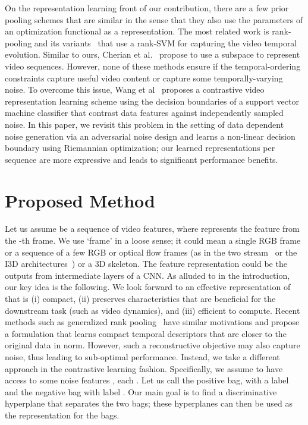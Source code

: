 \documentclass[runningheads]{llncs}
\begin{document}
On the representation learning front of our contribution, there are a few prior pooling schemes that are similar in the sense that they also use the parameters of an optimization functional as a representation. The most related work is rank-pooling and its variants~\cite{fernando2016learning,fernando2015modeling,fernando2016discriminative,su2016hierarchical,bilen2017action,cherian2018non,wang2017ordered} that use a rank-SVM for capturing the video temporal evolution. Similar to ours, Cherian et al.~\cite{grp} propose to use a subspace  to represent video sequences. However, none of these methods ensure if the temporal-ordering constraints capture useful video content or capture some temporally-varying noise. To overcome this issue, Wang et al~\cite{wang2018video} proposes a contrastive video representation learning scheme using the decision boundaries of a support vector machine classifier that contrast data features against independently sampled noise. In this paper, we revisit this problem in the setting of data dependent noise generation via an adversarial noise design and learns a non-linear decision boundary using Riemannian optimization; our learned representations per sequence are more expressive and leads to significant performance benefits.  \section{Proposed Method}
Let us assume  be a sequence of video features, where  represents the feature from the -th frame. We use `frame' in a loose sense; it could mean a single RGB frame or a sequence of a few RGB or optical flow frames (as in the two stream~\cite{simonyan2014very} or the I3D architectures~\cite{carreira2017quo}) or a 3D skeleton. The feature representation  could be the outputs from intermediate layers of a CNN. As alluded to in the introduction, our key idea is the following. We look forward to an effective representation of  that is (i) compact, (ii) preserves characteristics that are beneficial for the downstream task (such as video dynamics), and (iii) efficient to compute. Recent methods such as generalized rank pooling~\cite{grp} have similar motivations and propose a formulation that learns compact temporal descriptors that are closer to the original data in  norm. However, such a reconstructive objective may also capture noise, thus leading to sub-optimal performance. Instead, we take a different approach in the contrastive learning fashion. Specifically, we assume to have access to some noise features , each . Let us call  the positive bag, with a label  and  the negative bag with label . Our main goal is to find a discriminative hyperplane that separates the two bags; these hyperplanes can then be used as the representation for the bags. 
\end{document}
